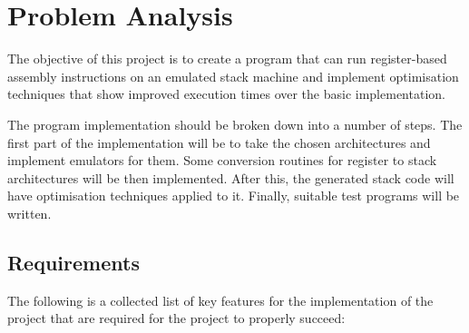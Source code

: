 \chapter{Problem Analysis}\label{ch:problemanalysis}
The objective of this project is to create a program that can run
register-based assembly instructions on an emulated stack machine and implement
optimisation techniques that show improved execution times over the basic
implementation.

The program implementation should be broken down into a number of steps.
The first part of the implementation will be to take the chosen architectures
and implement emulators for them.  Some conversion routines for register to
stack architectures will be then implemented. After this, the generated stack
code will have optimisation techniques applied to it. Finally, suitable test
programs will be written.

\section{Requirements}
The following is a collected list of key features for the implementation of
the project that are required for the project to properly succeed:

